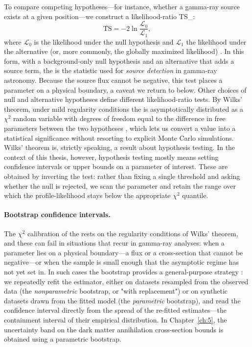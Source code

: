 To compare competing hypotheses---for instance, whether a gamma-ray source exists at a given position---we construct a likelihood-ratio \gls{TS_}:
\begin{equation}
	\mathrm{TS} = -2 \ln \frac{\mathcal{L}_0}{\mathcal{L}_1},
	\label{eq:ts}
\end{equation}
where $\mathcal{L}_0$ is the likelihood under the null hypothesis and $\mathcal{L}_1$ the likelihood under the alternative (or, more commonly, the globally maximized likelihood) \cite{Mattox:1996zz}.
In this form, with a background-only null hypothesis and an alternative that adds a source term, the \TS is the statistic used for \emph{source detection} in gamma-ray astronomy.
Because the source flux cannot be negative, this test places a parameter on a physical boundary, a caveat we return to below.
Other choices of null and alternative hypotheses define different likelihood-ratio tests.
By Wilks' theorem, under mild regularity conditions the \TS is asymptotically distributed as a $\chi^2$ random variable with degrees of freedom equal to the difference in free parameters between the two hypotheses \cite{Wilks:1938}, which lets us convert a \TS value into a statistical significance without resorting to explicit Monte Carlo simulations.
Wilks' theorem is, strictly speaking, a result about hypothesis testing. In the context of this thesis, however, hypothesis testing mostly means setting confidence intervals or upper bounds on a parameter of interest. These are obtained by inverting the test: rather than fixing a single threshold and asking whether the null is rejected, we scan the parameter and retain the range over which the profile-likelihood \TS stays below the appropriate $\chi^2$ quantile.

\paragraph{Bootstrap confidence intervals.}

The $\chi^2$ calibration of the \TS rests on the regularity conditions of Wilks' theorem, and these can fail in situations that recur in gamma-ray analyses: when a parameter lies on a physical boundary---a flux or a cross-section that cannot be negative---or when the sample is small enough that the asymptotic regime has not yet set in.
In such cases the bootstrap provides a general-purpose strategy \cite{Efron:1979}: we repeatedly refit the estimator, either on datasets resampled from the observed data (the \emph{nonparametric} bootstrap, or "with replacement") or on synthetic datasets drawn from the fitted model (the \emph{parametric} bootstrap), and read the confidence interval directly from the spread of the re-fitted estimates---the containment interval of their empirical distribution.
In Chapter~\ref{ch:5}, the uncertainty band on the dark matter annihilation cross-section bounds is obtained using a parametric bootstrap.


